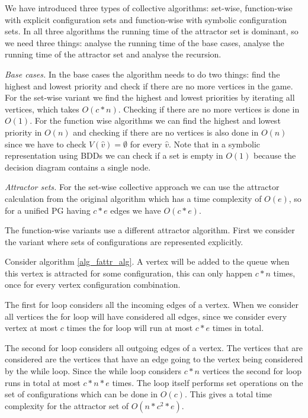 We have introduced three types of collective algorithms: set-wise, function-wise with explicit configuration sets and function-wise with symbolic configuration sets. In all three algorithms the running time of the attractor set is dominant, so we need three things: analyse the running time of the base cases, analyse the running time of the attractor set and analyse the recursion.

\textit{Base cases.} In the base cases the algorithm needs to do two things: find the highest and lowest priority and check if there are no more vertices in the game. For the set-wise variant we find the highest and lowest priorities by iterating all vertices, which takes $O(c*n)$. Checking if there are no more vertices is done in $O(1)$. For the function wise algorithms we can find the highest and lowest priority in $O(n)$ and checking if there are no vertices is also done in $O(n)$ since we have to check $V(\hat{v}) = \emptyset$ for every $\hat{v}$. Note that in a symbolic representation using BDDs we can check if a set is empty in $O(1)$ because the decision diagram contains a single node.

\textit{Attractor sets.} For the set-wise collective approach we can use the attractor calculation from the original algorithm which has a time complexity of $O(e)$, so for a unified PG having $c*e$ edges we have $O(c*e)$.

The function-wise variants use a different attractor algorithm. First we consider the variant where sets of configurations are represented explicitly.

Consider algorithm \ref{alg_fattr_alg}. A vertex will be added to the queue when this vertex is attracted for some configuration, this can only happen $c*n$ times, once for every vertex configuration combination. 

The first for loop considers all the incoming edges of a vertex. When we consider all vertices the for loop will have considered all edges, since we consider every vertex at most $c$ times the for loop will run at most $c*e$ times in total.

The second for loop considers all outgoing edges of a vertex. The vertices that are considered are the vertices that have an edge going to the vertex being considered by the while loop. Since the while loop considers $c*n$ vertices the second for loop runs in total at most $c * n * e$ times. The loop itself performs set operations on the set of configurations which can be done in $O(c)$. This gives a total time complexity for the attractor set of $O(n*c^2*e)$.

